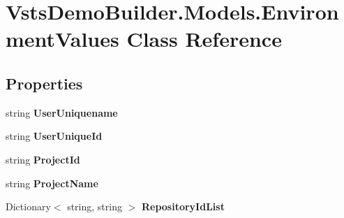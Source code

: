 \hypertarget{class_vsts_demo_builder_1_1_models_1_1_environment_values}{}\section{Vsts\+Demo\+Builder.\+Models.\+Environment\+Values Class Reference}
\label{class_vsts_demo_builder_1_1_models_1_1_environment_values}
\subsection*{Properties}
\begin{DoxyCompactItemize}
\item 
\mbox{\label{class_vsts_demo_builder_1_1_models_1_1_environment_values_afff108206c2a97aeedec03d8444de566}} 
string {\bfseries User\+Uniquename}
\item 
\mbox{\label{class_vsts_demo_builder_1_1_models_1_1_environment_values_a966854431abd3cb9252bc774d25c42f7}} 
string {\bfseries User\+Unique\+Id}
\item 
\mbox{\label{class_vsts_demo_builder_1_1_models_1_1_environment_values_a95aade294cd2464a8051249c246a03d1}} 
string {\bfseries Project\+Id}
\item 
\mbox{\label{class_vsts_demo_builder_1_1_models_1_1_environment_values_a14d52f1184707c3500ddb70eccb8f968}} 
string {\bfseries Project\+Name}
\item 
\mbox{\label{class_vsts_demo_builder_1_1_models_1_1_environment_values_adb9b7ab8dff7853a585e1e6e4a45a515}} 
Dictionary$<$ string, string $>$ {\bfseries Repository\+Id\+List}

\end{DoxyCompactItemize}
